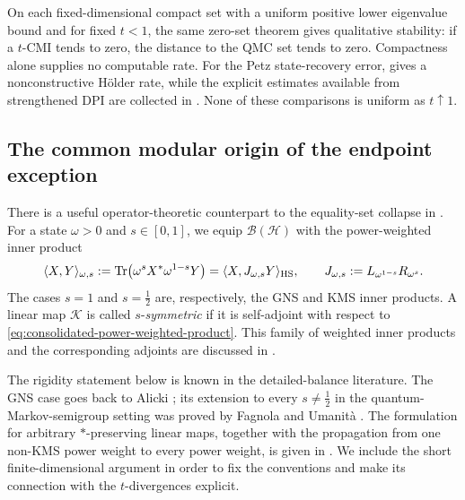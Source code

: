 \documentclass[11pt]{article}
\theoremstyle{remark}
\newcommand{\1}{\mathbbm{1}}
\begin{document}
On each fixed-dimensional compact set with a uniform positive lower
eigenvalue bound and for
fixed $t<1$, the same zero-set theorem gives qualitative stability:
if a $t$-CMI tends to zero, the distance to the QMC set tends to
zero.  Compactness alone supplies no computable rate.  For the Petz
state-recovery error, 
gives a nonconstructive H\"older rate, while the explicit estimates
available from strengthened DPI are collected in
.  None of these
comparisons is uniform as $t\uparrow1$.

\subsection{The common modular origin of the endpoint exception}
\label{subsec:consolidated-weighted-symmetry}

There is a useful operator-theoretic counterpart to the equality-set
collapse in .  For a state
$\omega>0$ and $s\in[0,1]$, we equip
$\mathcal B(\mathcal H)$ with the power-weighted inner product
\begin{equation}
 \langle X,Y\rangle_{\omega,s}
 :=\operatorname{Tr}\!\left(\omega^sX^*\omega^{1-s}Y\right)
 =\langle X,J_{\omega,s}Y\rangle_{\rm HS},
 \qquad
 J_{\omega,s}:=L_{\omega^{1-s}}R_{\omega^s}.
 \label{eq:consolidated-power-weighted-product}
\end{equation}
The cases $s=1$ and $s=\frac12$ are, respectively, the GNS and KMS
inner products.  A linear map $\mathcal K$ is called
$s$-\emph{symmetric} if it is self-adjoint with respect to
\eqref{eq:consolidated-power-weighted-product}.  This family of weighted
inner products and the corresponding adjoints are discussed in
\cite[Section~2.2]{carlen2017gradient}.

The rigidity statement below is known in the detailed-balance
literature.  The GNS case goes back to Alicki
\cite{alicki1976detailed}; its extension to every
$s\neq\frac12$ in the quantum-Markov-semigroup setting was proved by
Fagnola and Umanit\`a
\cite[Proposition~8.1]{fagnola2007generators}.  The
formulation for arbitrary $*$-preserving linear maps, together with
the propagation from one non-KMS power weight to every power weight,
is given in
\cite[Lemmas~2.5 and~2.8 and Theorem~2.9]{carlen2017gradient}.  We
include the short finite-dimensional argument in order to fix the
conventions and make its connection with the $t$-divergences
explicit.
\end{document}
